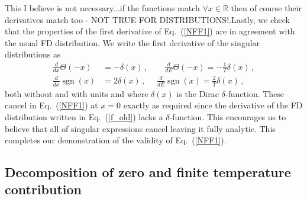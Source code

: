 \documentclass[sn-mathphys,Numbered]{sn-jnl}
\newcommand{\req}[1]{Eq.~(\ref{#1})}
\newcommand{\rf}[1]{Fig.~{\ref{#1}}}
\newcommand*{\MeV}{\text{ MeV}}
\DeclareMathOperator{\sgn}{sgn}
\newcommand{\rev}[1]{{\color{blue}#1}}
\begin{document}
\rev{This I believe is not necessary...if the functions match $\forall x \in \mathbb{R}$ then of course their derivatives match too - NOT TRUE FOR DISTRIBUTIONS!.}Lastly, we check that the properties of the first derivative of \req{NFF1} are in agreement with the usual FD distribution. We write the first derivative of the singular distributions as 
\begin{align}
\label{NFF1b}
\frac{d}{dx}\Theta(-x)&=-\delta(x)\,,\qquad 
\frac{d}{dE}\Theta(-x)=-\frac{1}{T}\delta(x)\,,\\
\frac{d}{dx}\sgn(x)&=2\delta(x)\,,\,\,\quad 
\frac{d}{dE}\sgn(x)=\frac{2}{T}\delta(x)\,,
\end{align}
both without and with units and where $\delta(x)$ is the Dirac $\delta$-function. These cancel in \req{NFF1} at $x=0$ exactly as required since the derivative of the FD distribution written in \req{f_old} lacks a $\delta$-function. This encourages us to believe that all of singular expressions cancel leaving it fully analytic. This completes our demonstration of the validity of \req{NFF1}.

\subsection{Decomposition of zero and finite temperature contribution}
\label{Numerical}

\end{document}

